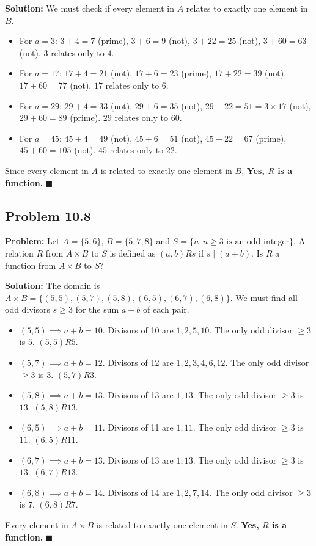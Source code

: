 \documentclass[11pt, a4paper]{article}
\theoremstyle{definition}
\theoremstyle{remark}
\begin{document}
\textbf{Solution:}
We must check if every element in $A$ relates to exactly one element in $B$.
\begin{itemize}
    \item For $a = 3$: $3+4=7$ (prime), $3+6=9$ (not), $3+22=25$ (not), $3+60=63$ (not). $3$ relates only to $4$.
    \item For $a = 17$: $17+4=21$ (not), $17+6=23$ (prime), $17+22=39$ (not), $17+60=77$ (not). $17$ relates only to $6$.
    \item For $a = 29$: $29+4=33$ (not), $29+6=35$ (not), $29+22=51 = 3 \times 17$ (not), $29+60=89$ (prime). $29$ relates only to $60$.
    \item For $a = 45$: $45+4=49$ (not), $45+6=51$ (not), $45+22=67$ (prime), $45+60=105$ (not). $45$ relates only to $22$.
\end{itemize}
Since every element in $A$ is related to exactly one element in $B$, \textbf{Yes, $R$ is a function.}
$\blacksquare$

\subsection{Problem 10.8}
\textbf{Problem:} Let $A = \{5, 6\}$, $B = \{5, 7, 8\}$ and $S = \{n : n \ge 3 \text{ is an odd integer}\}$. A relation $R$ from $A \times B$ to $S$ is defined as $(a, b) R s$ if $s \mid (a + b)$. Is $R$ a function from $A \times B$ to $S$?

\textbf{Solution:}
The domain is $A \times B = \{(5,5), (5,7), (5,8), (6,5), (6,7), (6,8)\}$. We must find all odd divisors $s \ge 3$ for the sum $a+b$ of each pair.
\begin{itemize}
    \item $(5,5) \implies a+b = 10$. Divisors of 10 are $1, 2, 5, 10$. The only odd divisor $\ge 3$ is $5$. $(5,5) R 5$.
    \item $(5,7) \implies a+b = 12$. Divisors of 12 are $1, 2, 3, 4, 6, 12$. The only odd divisor $\ge 3$ is $3$. $(5,7) R 3$.
    \item $(5,8) \implies a+b = 13$. Divisors of 13 are $1, 13$. The only odd divisor $\ge 3$ is $13$. $(5,8) R 13$.
    \item $(6,5) \implies a+b = 11$. Divisors of 11 are $1, 11$. The only odd divisor $\ge 3$ is $11$. $(6,5) R 11$.
    \item $(6,7) \implies a+b = 13$. Divisors of 13 are $1, 13$. The only odd divisor $\ge 3$ is $13$. $(6,7) R 13$.
    \item $(6,8) \implies a+b = 14$. Divisors of 14 are $1, 2, 7, 14$. The only odd divisor $\ge 3$ is $7$. $(6,8) R 7$.
\end{itemize}
Every element in $A \times B$ is related to exactly one element in $S$. \textbf{Yes, $R$ is a function.}
$\blacksquare$
\end{document}
